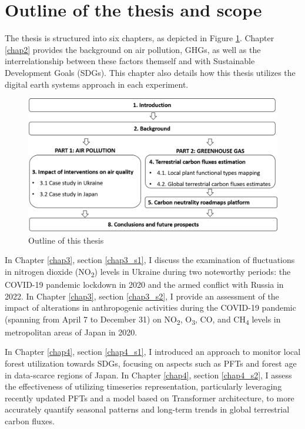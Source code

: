 \section{Outline of the thesis and scope}

The thesis is structured into six chapters, as depicted in Figure \ref{fig:chap1_fig2}. Chapter \ref{chap2} provides the background on air pollution, GHGs, as well as the interrelationship between these factors themself and with Sustainable Development Goals (SDGs). This chapter also details how this thesis utilizes the digital earth systems approach in each experiment. \par

\begin{figure}[tbh!]
    \centering
    \includegraphics[width=\textwidth]{figs/chap1/outline.png}
    \caption{Outline of this thesis}
    \label{fig:chap1_fig2}
\end{figure}

In Chapter \ref{chap3}, section \ref{chap3_s1}, I discuss the examination of fluctuations in nitrogen dioxide (NO\textsubscript{2}) levels in Ukraine during two noteworthy periods: the COVID-19 pandemic lockdown in 2020 and the armed conflict with Russia in 2022. In Chapter \ref{chap3}, section \ref{chap3_s2}, I provide an assessment of the impact of alterations in anthropogenic activities during the COVID-19 pandemic (spanning from April 7 to December 31) on NO\textsubscript{2}, O\textsubscript{3}, CO, and CH\textsubscript{4} levels in metropolitan areas of Japan in 2020. \par

In Chapter \ref{chap4}, section \ref{chap4_s1}, I introduced an approach to monitor local forest utilization towards SDGs, focusing on aspects such as PFTs and forest age in data-scarce regions of Japan. In Chapter \ref{chap4}, section \ref{chap4_s2}, I assess the effectiveness of utilizing timeseries representation, particularly leveraging recently updated PFTs and a model based on Transformer architecture, to more accurately quantify seasonal patterns and long-term trends in global terrestrial carbon fluxes. \par

